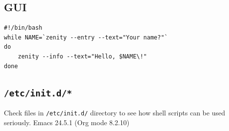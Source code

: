 \documentclass[12pt]{article}
\begin{document}
\subsection{GUI}
\label{sec-3-7}
\begin{verbatim}
#!/bin/bash
while NAME=`zenity --entry --text="Your name?"` 
do
    zenity --info --text="Hello, $NAME\!"
done
\end{verbatim}

\subsection{\texttt{/etc/init.d/*}}
\label{sec-3-8}
Check files in \texttt{/etc/init.d/} directory to see how shell scripts can be used seriously.
Emacs 24.5.1 (Org mode 8.2.10)
\end{document}
